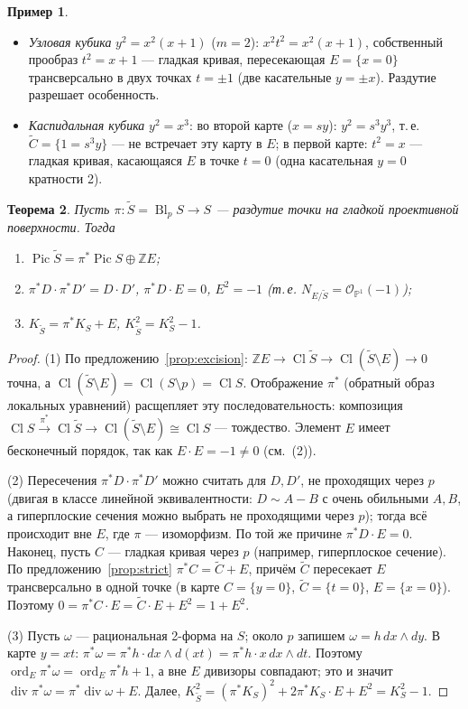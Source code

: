 \documentclass[11pt,a4paper]{article}
\theoremstyle{plain}
\newtheorem{theorem}{Теорема}[section]
\theoremstyle{definition}
\newtheorem{example}[theorem]{Пример}
\theoremstyle{remark}
\newcommand{\Z}{\mathbb{Z}}
\newcommand{\PP}{\mathbb{P}}
\newcommand{\cO}{\mathcal{O}}
\DeclareMathOperator{\Pic}{Pic}
\DeclareMathOperator{\Cl}{Cl}
\DeclareMathOperator{\divv}{div}
\DeclareMathOperator{\ord}{ord}
\DeclareMathOperator{\Bl}{Bl}
\begin{document}
\begin{example}
\begin{itemize}
\item \emph{Узловая кубика} $y^2=x^2(x+1)$ ($m=2$): $x^2t^2=x^2(x+1)$, собственный прообраз $t^2=x+1$ ---
гладкая кривая, пересекающая $E=\{x=0\}$ трансверсально в двух точках $t=\pm1$ (две касательные
$y=\pm x$). Раздутие разрешает особенность.
\item \emph{Каспидальная кубика} $y^2=x^3$: во второй карте ($x=sy$): $y^2=s^3y^3$, т.\,е. $\tilde C=\{1=s^3y\}$
--- не встречает эту карту в $E$; в первой карте: $t^2=x$ --- гладкая кривая, касающаяся $E$ в точке $t=0$
(одна касательная $y=0$ кратности 2).
\end{itemize}
\end{example}

\begin{theorem}\label{thm:blowup-Pic}
Пусть $\pi\colon\tilde S=\Bl_pS\to S$ --- раздутие точки на гладкой проективной поверхности. Тогда
\begin{enumerate}
\item $\Pic\tilde S=\pi^*\Pic S\oplus\Z E$;
\item $\pi^*D\cdot\pi^*D'=D\cdot D'$, $\pi^*D\cdot E=0$, $E^2=-1$ (т.\,е. $N_{E/\tilde S}=\cO_{\PP^1}(-1)$);
\item $K_{\tilde S}=\pi^*K_S+E$, $K_{\tilde S}^2=K_S^2-1$.
\end{enumerate}
\end{theorem}
\begin{proof}
(1) По предложению~\ref{prop:excision}: $\Z E\to\Cl\tilde S\to\Cl(\tilde S\setminus E)\to0$ точна, а
$\Cl(\tilde S\setminus E)=\Cl(S\setminus p)=\Cl S$. Отображение $\pi^*$ (обратный образ локальных
уравнений) расщепляет эту последовательность: композиция $\Cl S\xrightarrow{\pi^*}\Cl\tilde S\to
\Cl(\tilde S\setminus E)\cong\Cl S$ --- тождество. Элемент $E$ имеет бесконечный порядок, так как
$E\cdot E=-1\ne0$ (см.~(2)).

(2) Пересечения $\pi^*D\cdot\pi^*D'$ можно считать для $D,D'$, не проходящих через $p$ (двигая в классе
линейной эквивалентности: $D\sim A-B$ с очень обильными $A,B$, а гиперплоские сечения можно выбрать не
проходящими через $p$); тогда всё происходит вне $E$, где $\pi$ --- изоморфизм. По той же причине
$\pi^*D\cdot E=0$. Наконец, пусть $C$ --- гладкая кривая через $p$ (например, гиперплоское сечение). По
предложению~\ref{prop:strict} $\pi^*C=\tilde C+E$, причём $\tilde C$ пересекает $E$ трансверсально в одной точке
(в карте $C=\{y=0\}$, $\tilde C=\{t=0\}$, $E=\{x=0\}$). Поэтому
$0=\pi^*C\cdot E=\tilde C\cdot E+E^2=1+E^2$.

(3) Пусть $\omega$ --- рациональная 2-форма на $S$; около $p$ запишем $\omega=h\,dx\wedge dy$. В карте
$y=xt$: $\pi^*\omega=\pi^*h\cdot dx\wedge d(xt)=\pi^*h\cdot x\,dx\wedge dt$. Поэтому
$\ord_E\pi^*\omega=\ord_E\pi^*h+1$, а вне $E$ дивизоры совпадают; это и значит
$\divv\pi^*\omega=\pi^*\divv\omega+E$. Далее, $K_{\tilde S}^2=(\pi^*K_S)^2+2\pi^*K_S\cdot E+E^2=K_S^2-1$.
\end{proof}
\end{document}
